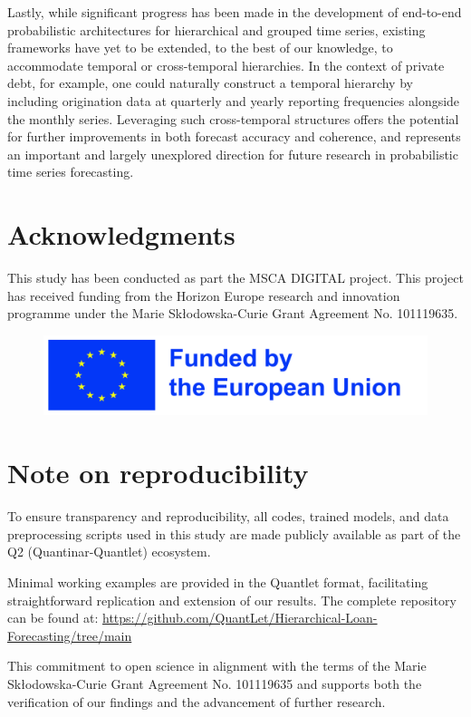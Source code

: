 \documentclass[letterpaper]{article}
\begin{document}
Lastly, while significant progress has been made in the development of end-to-end probabilistic architectures for hierarchical and grouped time series, existing frameworks have yet to be extended, to the best of our knowledge, to accommodate temporal or cross-temporal hierarchies. In the context of private debt, for example, one could naturally construct a temporal hierarchy by including origination data at quarterly and yearly reporting frequencies alongside the monthly series. Leveraging such cross-temporal structures offers the potential for further improvements in both forecast accuracy and coherence, and represents an important and largely unexplored direction for future research in probabilistic time series forecasting.

\section{Acknowledgments}

This study has been conducted as part the MSCA DIGITAL project. This project has received funding from the Horizon Europe research and innovation programme under the Marie Skłodowska-Curie Grant Agreement No. 101119635.

\begin{figure}[h]
    \centering
    \includegraphics[width=\linewidth]{EU_fund.jpg}
\end{figure}

\section{Note on reproducibility}

To ensure transparency and reproducibility, all codes, trained models, and data preprocessing scripts used in this study are made publicly available as part of the Q2 (Quantinar-Quantlet) ecosystem.

Minimal working examples are provided in the Quantlet format, facilitating straightforward replication and extension of our results. The complete repository can be found at: \url{https://github.com/QuantLet/Hierarchical-Loan-Forecasting/tree/main}

This commitment to open science in alignment with the terms of the Marie Skłodowska-Curie Grant Agreement No. 101119635 and supports both the verification of our findings and the advancement of further research.
\end{document}
